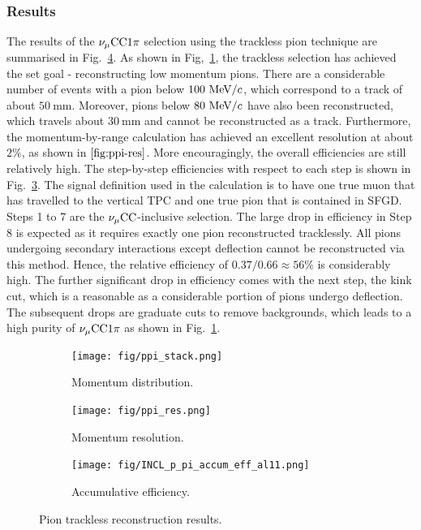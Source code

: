         \subsubsection{Results}
           The results of the $\nu_{\mu}\textrm{CC}1\pi$ selection using the trackless pion technique are summarised in Fig.~\ref{fig:piTLres}.
           As shown in Fig,~\ref{fig:ppi-stack}, the trackless selection has achieved the set goal - reconstructing low momentum pions. 
           There are a considerable number of events with a pion below $100~\textrm{MeV}/c$, which correspond to a track of about $50~\textrm{mm}$. 
           Moreover, pions below $80~\textrm{MeV}/c$ have also been reconstructed, which travels about $30~\textrm{mm}$ and cannot be reconstructed as a track. 
           Furthermore, the momentum-by-range calculation has achieved an excellent resolution at about $2\%$, as shown in $\ref{fig:ppi-res}$.
           More encouragingly, the overall efficiencies are still relatively high. 
           The step-by-step efficiencies with respect to each step is shown in Fig.~\ref{fig:tl-accum-eff}. 
           The signal definition used in the calculation is to have one true muon that has travelled to the vertical TPC and one true pion that is contained in SFGD. 
           Steps 1 to 7 are the $\nu_{\mu}\textrm{CC}$-inclusive selection. 
           The large drop in efficiency in Step 8 is expected as it requires exactly one pion reconstructed tracklessly. 
           All pions undergoing secondary interactions except deflection cannot be reconstructed via this method. 
           Hence, the relative efficiency of $0.37/0.66\approx56\%$ is considerably high. 
           The further significant drop in efficiency comes with the next step, the kink cut, which is a reasonable as a considerable portion of pions undergo deflection. 
           The subsequent drops are graduate cuts to remove backgrounds, which leads to a high purity of $\nu_{\mu}\textrm{CC}1\pi$ as shown in Fig.~\ref{fig:ppi-stack}.

           \begin{figure}[t]
               \centering
               \begin{subfigure}{0.3\textwidth}
                    \texttt{[image: fig/ppi\_stack.png]}
                    \caption{Momentum distribution.}
                    \label{fig:ppi-stack}
               \end{subfigure}
               \begin{subfigure}{0.3\textwidth}
                    \texttt{[image: fig/ppi\_res.png]}
                    \caption{Momentum resolution.}
                    \label{fig:ppi-res}
               \end{subfigure}
               \begin{subfigure}{0.3\textwidth}
                    \texttt{[image: fig/INCL\_p\_pi\_accum\_eff\_al11.png]}
                    \caption{Accumulative efficiency.}
                    \label{fig:tl-accum-eff}
               \end{subfigure}
               \caption{Pion trackless reconstruction results.}
               \label{fig:piTLres}
            \end{figure}


